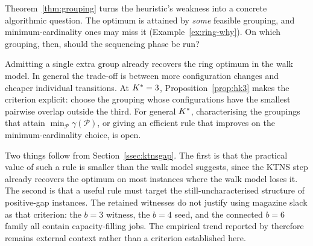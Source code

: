 Theorem~\ref{thm:grouping} turns the heuristic's weakness into a concrete algorithmic
question. The optimum is attained by \emph{some} feasible grouping, and
minimum-cardinality ones may miss it (Example~\ref{ex:ring-why}). On which grouping,
then, should the sequencing phase be run?

Admitting a single extra group already recovers the ring optimum in the walk model. In
general the trade-off is between more configuration changes and cheaper individual
transitions. At $K^{\ast}=3$, Proposition~\ref{prop:hk3} makes the criterion explicit:
choose the grouping whose configurations have the smallest pairwise overlap outside
the third. For general $K^{\ast}$, characterising the groupings that attain
$\min_{\mathcal{P}}\gamma(\mathcal{P})$, or giving an efficient rule that improves on
the minimum-cardinality choice, is open.

Two things follow from Section~\ref{ssec:ktnsgap}. The first is that the practical value
of such a rule is smaller than the walk model suggests, since the KTNS step already
recovers the optimum on most instances where the walk model loses it. The second is
that a useful rule must target the still-uncharacterised structure of positive-gap
instances. The retained witnesses do not justify using magazine slack as that
criterion: the $b=3$ witness, the $b=4$ seed, and the connected $b=6$ family all
contain capacity-filling jobs. The empirical trend reported by \citet{Burger2015}
therefore remains external context rather than a criterion established here.
